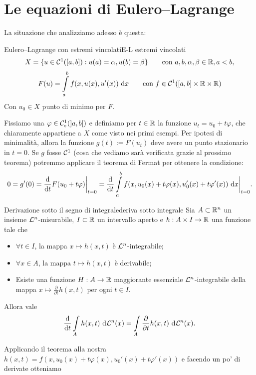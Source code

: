 \documentclass[openany]{book}
\newcommand\di{\text{d}}
\begin{document}
\section{Le equazioni di Eulero--Lagrange}
La situazione che analizziamo adesso è questa:

\begin{situation}{Eulero--Lagrange con estremi vincolati}{E-L estremi vincolati}
    \[ X = \{u \in \mathcal{C}^1([a,b]):u(a)=\alpha, u(b)=\beta\} \qquad \text{con }a,b,\alpha,\beta \in \mathbb{R}, a<b, \]
    \[ F(u) = \intop_a^b f(x,u(x),u'(x))\de x \qquad \text{con } f \in \mc{C}^1([a,b]\times\R\times\R)\]
    Con $u_0 \in X$ punto di minimo per $F$.
\end{situation}

Fissiamo una $\varphi \in \mathcal{C}_c^1(]a,b[)$ e definiamo per $t \in \mathbb{R}$ la funzione $u_t = u_0 + t\varphi$, che chiaramente appartiene a $X$ come visto nei primi esempi. Per ipotesi di minimalità, allora la funzione $g(t) := F(u_t)$ deve avere un punto stazionario in $t=0$. Se $g$ fosse $\mathcal{C}^1$ (cosa che vediamo sarà verificata grazie al prossimo teorema) potremmo applicare il teorema di Fermat per ottenere la condizione:
\[0 = g'(0) = \frac{\di}{\di t}F(u_0 + t \varphi)\bigg|_{t=0} = \frac{\di}{\di t} \intop_a^b f(x, u_0(x) + t\varphi(x), u_0'(x) + t\varphi'(x)) \de x \bigg|_{t=0}.\]

\begin{theorem}{Derivazione sotto il segno di integrale}{deriva sotto integrale}
    Sia $A \subset \mathbb{R}^n$ un insieme $\mathcal{L}^n$-misurabile, $I\subset \mathbb{R}$ un intervallo aperto e $h: A\times I \to \mathbb{R}$ una funzione tale che\begin{itemize}
        \item $\forall t \in I$, la mappa $x\mapsto h(x,t)$ è $\mathcal{L}^n$-integrabile;
        \item $\forall x \in A$, la mappa $t\mapsto h(x,t)$ è derivabile;
        \item Esiste una funzione $H : A\to\mathbb{R}$ maggiorante essenziale $\mathcal{L}^n$-integrabile della mappa $x\mapsto \frac{\partial}{\partial t} h(x,t)$ per ogni $t \in I$.
    \end{itemize}
    Allora vale
    \[ \frac{\di}{\di t}\intop_A h(x,t)\de \L^n(x) = \intop_A \frac{\partial}{\partial t} h(x,t) \de\L^n(x) .\]
\end{theorem}

Applicando il teorema alla nostra $h(x,t) = f(x,u_0(x)+t\varphi(x), u_0'(x) + t\varphi'(x))$ e facendo un po' di derivate otteniamo
\end{document}
